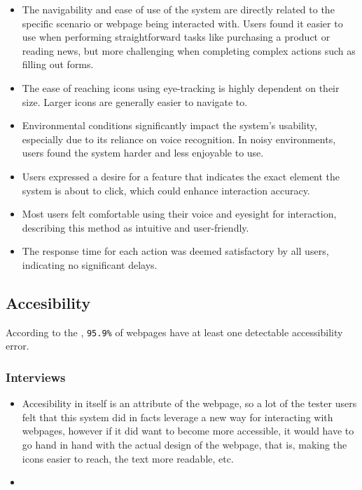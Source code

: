 \begin{itemize}
    \item The navigability and ease of use of the system are directly related to the specific scenario or webpage being interacted with. Users found it easier to use when performing straightforward tasks like purchasing a product or reading news, but more challenging when completing complex actions such as filling out forms.
    \item The ease of reaching icons using eye-tracking is highly dependent on their size. Larger icons are generally easier to navigate to.
    \item Environmental conditions significantly impact the system's usability, especially due to its reliance on voice recognition. In noisy environments, users found the system harder and less enjoyable to use.
    \item Users expressed a desire for a feature that indicates the exact element the system is about to click, which could enhance interaction accuracy.
    \item Most users felt comfortable using their voice and eyesight for interaction, describing this method as intuitive and user-friendly.
    \item The response time for each action was deemed satisfactory by all users, indicating no significant delays.
\end{itemize}


\subsection{Accesibility}

According to the \cite{techreport:webaim-2024}, \verb|95.9%| of webpages have at least one detectable accessibility error.

\subsubsection{Interviews}

\begin{itemize}
    \item Accesibility in itself is an attribute of the webpage, so a lot of the tester users felt that this system did in facts leverage a new way for interacting with webpages, however if it did want to become more accessible, it would have to go hand in hand with the actual design of the webpage, that is, making the icons easier to reach, the text more readable, etc.
    \item 
\end{itemize}

